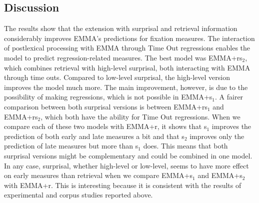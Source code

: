 \subsection{Discussion}
The results show that the extension with surprisal and retrieval information considerably improves EMMA's predictions for fixation measures. The interaction of postlexical processing with EMMA through Time Out regressions enables the model to predict regression-related measures. The best model was EMMA+rs$_2$, which combines retrieval with high-level surprisal, both interacting with EMMA through time outs.  Compared to low-level surprisal, the high-level version improves the model much more. The main improvement, however, is due to the possibility of making regressions, which is not possible in EMMA+s$_1$.  A fairer comparison between both surprisal versions is between EMMA+rs$_1$ and EMMA+rs$_2$, which both have the ability for Time Out regressions.  When we compare each of these two models with EMMA+r, it shows that s$_1$ improves the prediction of both early and late measures a bit and that s$_2$ improves only the prediction of late measures but more than s$_1$ does.  This means that both surprisal versions might be complementary and could be combined in one model. 
In any case, surprisal, whether high-level or low-level, seems to have more effect on early measures than retrieval when we compare EMMA+s$_1$ and EMMA+s$_2$ with EMMA+r.  This is interesting because it is consistent with the results of experimental and corpus studies reported above. 





